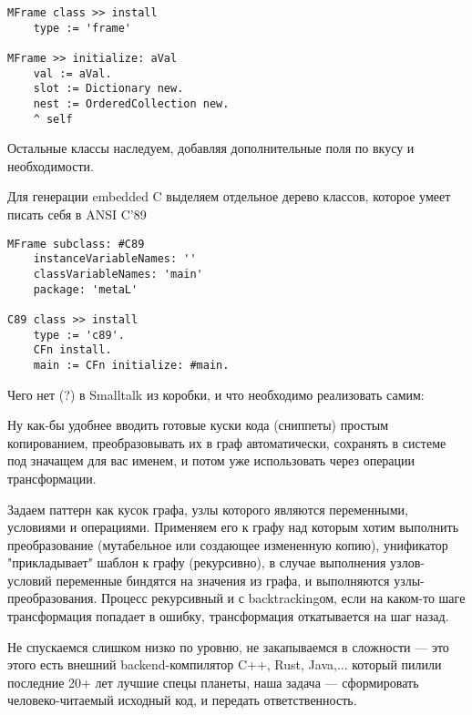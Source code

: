 \clearpage

\begin{verbatim}
MFrame class >> install
    type := 'frame'

MFrame >> initialize: aVal
    val := aVal.
    slot := Dictionary new.
    nest := OrderedCollection new.
    ^ self
\end{verbatim}

\clearpage

Остальные классы наследуем, добавляя дополнительные поля по вкусу и необходимости.

Для генерации embedded C выделяем отдельное дерево классов, которое умеет писать себя в ANSI C'89

\begin{verbatim}
MFrame subclass: #C89
    instanceVariableNames: ''
    classVariableNames: 'main'
    package: 'metaL'

C89 class >> install
    type := 'c89'.
    CFn install.
    main := CFn initialize: #main.
\end{verbatim}

\clearpage

Чего нет (?) в Smalltalk из коробки, и что необходимо реализовать самим:


Ну как-бы удобнее вводить готовые куски кода (сниппеты) простым копированием, преобразовывать их в граф автоматически, сохранять в системе под значащем для вас именем, и потом уже использовать через операции трансформации.


Задаем паттерн как кусок графа, узлы которого являются переменными, условиями и операциями. Применяем его к графу над которым хотим выполнить преобразование (мутабельное или создающее измененную копию), унификатор "прикладывает" шаблон к графу (рекурсивно), в случае выполнения узлов-условий переменные биндятся на значения из графа, и выполняются узлы-преобразования. Процесс рекурсивный и с backtrackingом, если на каком-то шаге трансформация попадает в ошибку, трансформация откатывается на шаг назад.


Не спускаемся слишком низко по уровню, не закапываемся в сложности — это этого есть внешний backend-компилятор C++, Rust, Java,... который пилили последние 20+ лет лучшие спецы планеты, наша задача — сформировать человеко-читаемый исходный код, и передать ответственность.

